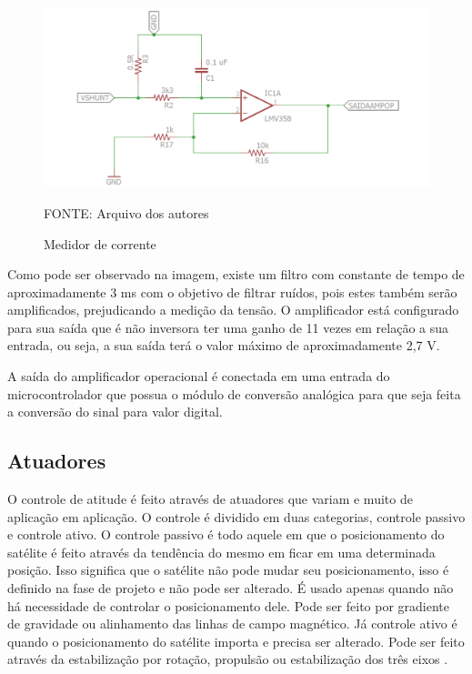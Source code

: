\documentclass[
	12pt,				%
	openany,			%
	twoside,			%
	a4paper,			%
	english,			%
	french,				%
	spanish,			%
	brazil,				%
	oldfontcommands
	]{abntex2}
\begin{document}
\begin{figure}[th]
	\caption{Medidor de corrente}
	\centering
	\includegraphics[width=1\linewidth]{./figs/Medidor_corrente_motores}
	
	\begin{small}
		FONTE: Arquivo dos autores
	\end{small}
	\label{fig:Medidor_corrente}
\end{figure}


Como pode ser observado na imagem, existe um filtro com constante de tempo de aproximadamente 3 ms com o objetivo de filtrar ruídos, pois estes também serão amplificados, prejudicando a medição da tensão.
O amplificador está configurado para sua saída que é não inversora ter uma ganho de 11 vezes em relação a sua entrada, ou seja, a sua saída terá o valor máximo de aproximadamente 2,7 V.

A saída do amplificador operacional é conectada em uma entrada do microcontrolador que possua o módulo de conversão analógica para que seja feita a conversão do sinal para valor digital.  

\subsection{Atuadores}

O controle de atitude é feito através de atuadores que variam e muito de aplicação em aplicação. O controle é dividido em duas categorias, controle passivo e controle ativo. O controle passivo é todo aquele em que o posicionamento do satélite é feito através da tendência do mesmo em ficar em uma determinada posição. Isso significa que o satélite não pode mudar seu posicionamento, isso é definido na fase de projeto e não pode ser alterado. É usado apenas quando não há necessidade de controlar o posicionamento dele. Pode ser feito por gradiente de gravidade ou alinhamento das linhas de campo magnético. Já controle ativo é quando o posicionamento do satélite importa e precisa ser alterado. Pode ser feito através da estabilização por rotação, propulsão ou estabilização dos três eixos \cite{FrancLav}.
\end{document}
